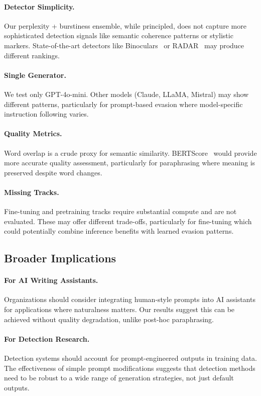 \paragraph{Detector Simplicity.} Our perplexity + burstiness ensemble, while principled, does not capture more sophisticated detection signals like semantic coherence patterns or stylistic markers. State-of-the-art detectors like Binoculars~\citep{hans2024binoculars} or RADAR~\citep{hu2023radar} may produce different rankings.

\paragraph{Single Generator.} We test only GPT-4o-mini. Other models (Claude, LLaMA, Mistral) may show different patterns, particularly for prompt-based evasion where model-specific instruction following varies.

\paragraph{Quality Metrics.} Word overlap is a crude proxy for semantic similarity. BERTScore~\citep{zhang2020bertscore} would provide more accurate quality assessment, particularly for paraphrasing where meaning is preserved despite word changes.

\paragraph{Missing Tracks.} Fine-tuning and pretraining tracks require substantial compute and are not evaluated. These may offer different trade-offs, particularly for fine-tuning which could potentially combine inference benefits with learned evasion patterns.

\subsection{Broader Implications}

\paragraph{For AI Writing Assistants.} Organizations should consider integrating human-style prompts into AI assistants for applications where naturalness matters. Our results suggest this can be achieved without quality degradation, unlike post-hoc paraphrasing.

\paragraph{For Detection Research.} Detection systems should account for prompt-engineered outputs in training data. The effectiveness of simple prompt modifications suggests that detection methods need to be robust to a wide range of generation strategies, not just default outputs.

